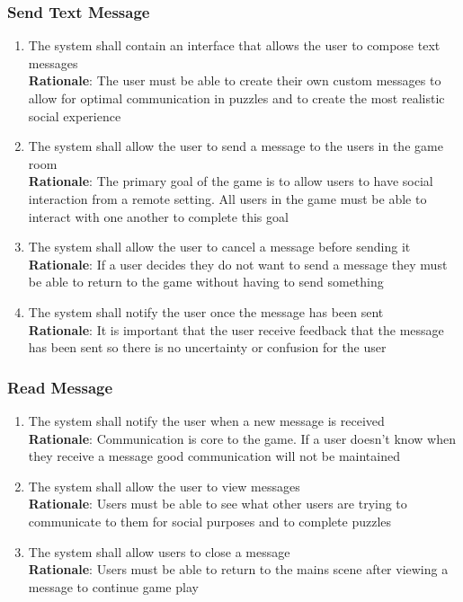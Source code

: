 \documentclass[12pt]{article}
\begin{document}
\subsubsection{Send Text Message}
    \begin{enumerate}[label=SM\arabic*., series=SendMessage]
        \item The system shall contain an interface that allows the user to compose text messages\\
        \textbf{Rationale}: The user must be able to create their own custom messages to allow for optimal communication in puzzles and to create the most realistic social experience
        \item The system shall allow the user to send a message to the users in the game room\\
        \textbf{Rationale}: The primary goal of the game is to allow users to have social interaction from a remote setting. All users in the game must be able to interact with one another to complete this goal
        \item The system shall allow the user to cancel a message before sending it\\
        \textbf{Rationale}: If a user decides they do not want to send a message they must be able to return to the game without having to send something
        \item The system shall notify the user once the message has been sent\\
        \textbf{Rationale}: It is important that the user receive feedback that the message has been sent so there is no uncertainty or confusion for the user
    \end{enumerate}
\subsubsection{Read Message}
    \begin{enumerate}[label=RM\arabic*., series=ReadMessage]
        \item The system shall notify the user when a new message is received\\
        \textbf{Rationale}: Communication is core to the game. If a user doesn't know when they receive a message good communication will not be maintained
        \item The system shall allow the user to view messages\\
        \textbf{Rationale}: Users must be able to see what other users are trying to communicate to them for social purposes and to complete puzzles
        \item The system shall allow users to close a message\\
        \textbf{Rationale}: Users must be able to return to the mains scene after viewing a message to continue game play
    \end{enumerate}
\end{document}
